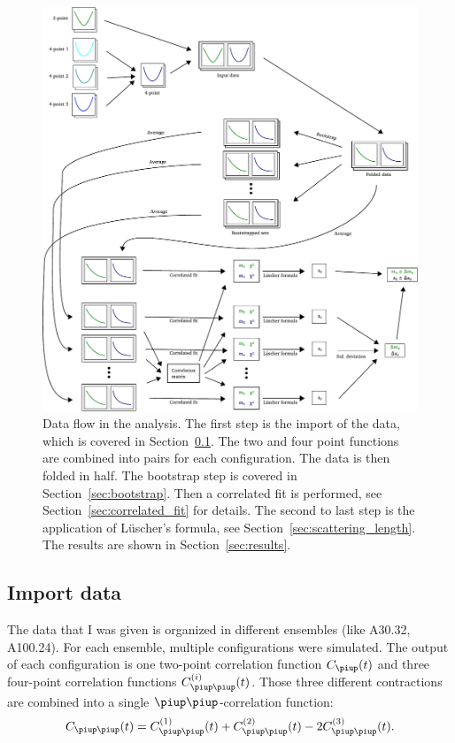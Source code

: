 \documentclass[11pt, english, fleqn, DIV=10, headinclude]{scrartcl}
\begin{document}
\begin{figure}[htbp]
    \centering
    \includegraphics[width=\linewidth]{sketches/Zeichnung.pdf}
    \caption{%
        Data flow in the analysis. The first step is the import of the data,
        which is covered in Section~\ref{sec:import}. The two and four point
        functions are combined into pairs for each configuration. The data is
        then folded in half. The bootstrap step is covered in
        Section~\ref{sec:bootstrap}. Then a correlated fit is performed, see
        Section~\ref{sec:correlated_fit} for details. The second to last step
        is the application of Lüscher's formula, see
        Section~\ref{sec:scattering_length}. The results are shown in
        Section~\ref{sec:results}.
    }
    \label{fig:analysis-flow}
\end{figure}

\subsection{Import data}
\label{sec:import}

The data that I was given is organized in different ensembles (like A30.32,
A100.24). For each ensemble, multiple configurations were simulated. The
output of each configuration is one two-point correlation function $C_\piup(t)$
and three four-point correlation functions $C_{\piup\piup}^{(i)}(t)$. Those
three different contractions are combined into a single
$\piup\piup$-correlation function:
\begin{equation}
    C_{\piup\piup}(t) = C_{\piup\piup}^{(1)}(t) + C_{\piup\piup}^{(2)}(t)
    - 2 C_{\piup\piup}^{(3)}(t).
\end{equation}
\end{document}
